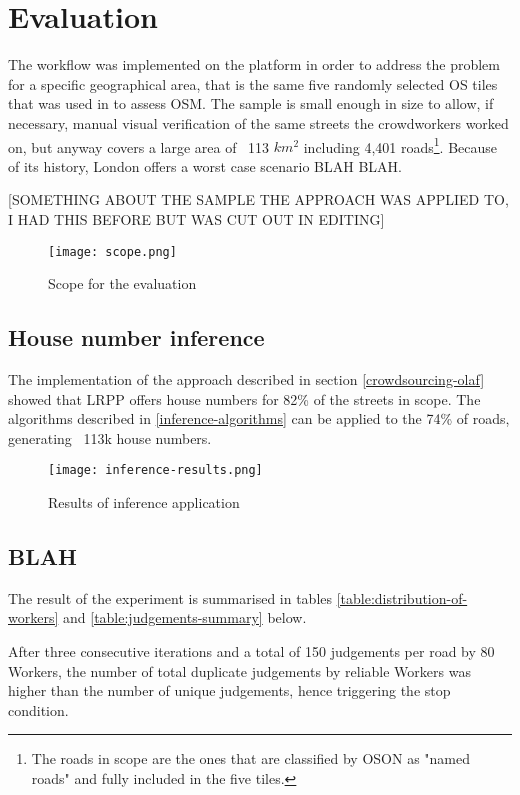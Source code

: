 \section{Evaluation}

The workflow was implemented on the platform in order to address the problem for a specific geographical area, that is the same five randomly selected OS tiles that was used in \cite{Haklay:2010vs} to assess OSM. The sample is small enough in size to allow, if necessary, manual visual verification of the same streets the crowdworkers worked on, but anyway covers a large area of ~113 $ km^2 $ including 4,401 roads\footnote{The roads in scope are the ones that are classified by OSON as "named roads" and fully included in the five tiles.}. Because of its history, London offers a worst case scenario BLAH BLAH. 

[SOMETHING ABOUT THE SAMPLE THE APPROACH WAS APPLIED TO, I HAD THIS BEFORE BUT WAS CUT OUT IN EDITING]

\begin{figure}
	\texttt{[image: scope.png]}
	\caption{Scope for the evaluation}
	\label{fig:scope}
\end{figure}

\subsection{House number inference}

The implementation of the approach described in section \ref{crowdsourcing-olaf} showed that LRPP offers house numbers for 82\% of the streets in scope. The algorithms described in \ref{inference-algorithms} can be applied to the 74\% of roads, generating ~113k house numbers. 

\begin{figure}
	\texttt{[image: inference-results.png]}
	\caption{Results of inference application}
	\label{fig:results-inference}
\end{figure}

\subsection{BLAH}

The result of the experiment is summarised in tables \ref{table:distribution-of-workers} and \ref{table:judgements-summary} below. 

After three consecutive iterations and a total of 150 judgements per road by 80 Workers, the number of total duplicate judgements by reliable Workers was higher than the number of unique judgements, hence triggering the stop condition. 

